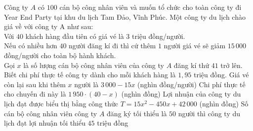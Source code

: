 

\begin{ex}%
	Công ty $A$ có $100$ cán bộ công nhân viên và muốn tổ chức cho toàn công ty đi Year End Party tại khu du lịch Tam Đảo, Vĩnh Phúc. Một công ty du lịch chào giá về với công ty A như sau:\\ 
	Với $40$ khách hàng đầu tiên có giá vé là $3$ triệu  đồng/người.\\
	Nếu có nhiều hơn $40$ người đăng kí đi thì cứ thêm $1$ người giá vé sẽ giảm $15\,000$  đồng/người cho toàn bộ hành khách.\\
	Gọi $x$ là số lượng cán bộ công nhân viên của công ty $A$  đăng kí thứ $41$ trở lên. Biết chi phí thực tế công ty dành cho mỗi khách hàng là $1{,}95$ triệu đồng.
	 \choiceTF
		{\True Giá vé còn lại  sau khi thêm $x$ người là $3\,000-15x$ (nghìn đồng/người)}
		{Chi phí thực tế cho chuyến đi  này là $1\,950\cdot(40-x)$ (nghìn đồng)}
		{Lợi nhuận của công ty du lịch đạt được biểu thị bằng công thức $T=15x^{2}-450x+42\,000$  (nghìn đồng)}
		{\True Số cán bộ công nhân viên công ty $A$ đăng ký tối thiểu là $50$ người thì công ty du lịch đạt lợi nhuận  tối thiểu $45$ triệu đồng}
\end{ex}
